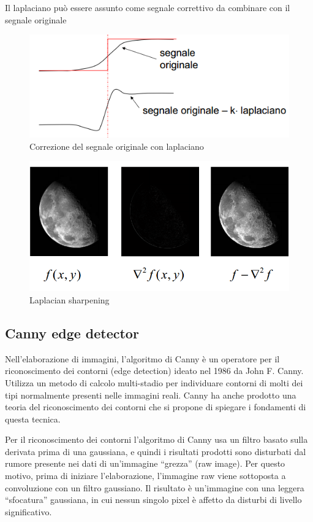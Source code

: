 Il laplaciano può essere assunto come segnale correttivo da combinare con il segnale originale

\begin{figure}[h]
\centering
\includegraphics[width=.8\textwidth]{img/laplaciano-correttivo.png}
\caption{Correzione del segnale originale con laplaciano}
\label{fig:laplaciano-correttivo}
\end{figure}

\begin{figure}[h]
\centering
\includegraphics[width=.8\textwidth]{img/laplacian-sharpening.png}
\caption{Laplacian sharpening}
\label{fig:laplacian-sharpening}
\end{figure}

\subsection{Canny edge detector}
Nell'elaborazione di immagini, l'algoritmo di Canny è un operatore per il riconoscimento dei contorni (edge detection) ideato nel 1986 da John F. Canny. Utilizza un metodo di calcolo multi-stadio per individuare contorni di molti dei tipi normalmente presenti nelle immagini reali. Canny ha anche prodotto una teoria del riconoscimento dei contorni che si propone di spiegare i fondamenti di questa tecnica.

Per il riconoscimento dei contorni l'algoritmo di Canny usa un filtro basato sulla derivata prima di una gaussiana, e quindi i risultati prodotti sono disturbati dal rumore presente nei dati di un'immagine ``grezza'' (raw image). Per questo motivo, prima di iniziare l'elaborazione, l'immagine raw viene sottoposta a convoluzione con un filtro gaussiano. Il risultato è un'immagine con una leggera ``sfocatura'' gaussiana, in cui nessun singolo pixel è affetto da disturbi di livello significativo.

